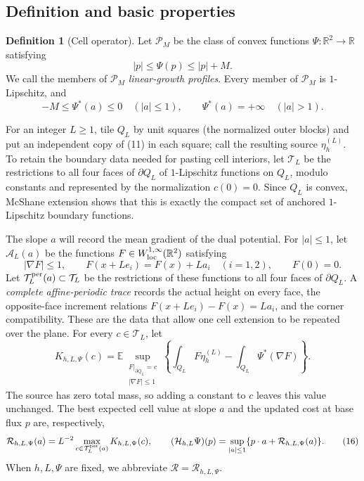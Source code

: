 \documentclass{smfart}
\theoremstyle{definition}
\newtheorem{definition}[theorem]{Definition}
\newcommand{\1}{\mathbf 1}
\begin{document}
\subsection{Definition and basic properties}

\begin{definition}[Cell operator]\label{def:cell-operator}
Let $\mathscr P_ M$ be the class of convex functions
$\Psi:\mathbb R^2\to\mathbb R$ satisfying
\begin{equation}
|p|\leq\Psi(p)\leq |p|+M.
\tag{13}
\end{equation}
We call the members of $\mathscr P_M$ \emph{linear-growth profiles}.
Every member of $\mathscr P_ M$ is $1$-Lipschitz, and
\begin{equation}
-M\leq\Psi^*(a)\leq0\quad (|a|\leq1),\qquad
\Psi^*(a)=+\infty\quad (|a|>1).
\tag{14}
\end{equation}

For an integer $L\geq1$, tile $Q_ L$ by unit squares (the normalized outer
blocks) and put an independent copy of (11) in each square; call the resulting
source $\eta_ h^{(L)}$.  To retain the boundary data needed for pasting
cell interiors, let
$\mathcal T_ L$ be the restrictions to all four faces of $\partial Q_ L$
of $1$-Lipschitz functions on $Q_ L$, modulo constants and represented
by the normalization $c(0)=0$.  Since $Q_ L$ is convex, McShane
extension shows that this is exactly the compact set of anchored
$1$-Lipschitz boundary functions.

The slope $a$ will record the mean gradient of the dual potential.
For $|a|\leq1$, let $\mathcal A_ L(a)$ be the functions
$F\in W^{1,\infty}_ {\rm loc}(\mathbb R^2)$ satisfying
\begin{equation}
|\nabla F|\leq1,\qquad
F(x+Le_ i)=F(x)+La_ i\quad(i=1,2),\qquad F(0)=0.
\tag{14a}
\end{equation}
Let $\mathcal T_ L^{\rm per}(a)\subset\mathcal T_ L$ be the restrictions
of these functions to all four faces of $\partial Q_ L$.  A
\emph{complete affine-periodic trace} records the actual height on every
face, the opposite-face increment relations $F(x+Le_i)-F(x)=La_i$,
and the corner compatibility.  These are the data that allow one cell
extension to be repeated over the plane.  For every $c\in\mathcal T_ L$,
let
\begin{equation}
K_ {h,L,\Psi}(c)=\mathbb E\sup_ {\substack{F|_ {\partial Q_ L}=c\\
|\nabla F|\leq1}}
\left\{\int_ {Q_ L}F\eta_ h^{(L)}
-\int_ {Q_ L}\Psi^*(\nabla F)\right\}.
\tag{15}
\end{equation}
The source has zero total mass, so adding a constant to $c$ leaves this
value unchanged.  The best expected cell value at slope $a$ and the
updated cost at base flux $p$ are, respectively,
\begin{equation}
\mathcal R_ {h,L,\Psi}(a)=L^{-2}
\max_ {c\in\mathcal T_ L^{\rm per}(a)}K_ {h,L,\Psi}(c),\qquad
(\mathcal H_ {h,L}\Psi)(p)
=\sup_ {|a|\leq1}\{p\cdot a+\mathcal R_ {h,L,\Psi}(a)\}.
\tag{16}
\end{equation}
When $h,L,\Psi$ are fixed, we abbreviate
$\mathcal R=\mathcal R_{h,L,\Psi}$.


\end{definition}
\end{document}
